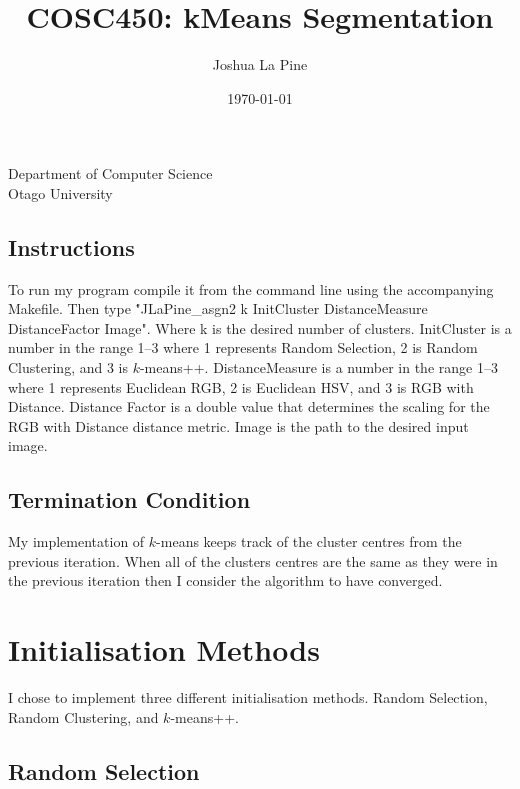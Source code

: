 \documentclass{article}
\title{COSC450: kMeans Segmentation} %
\author{Joshua La Pine} %
\date{\today} %
\begin{document}
\maketitle %

\begin{center}
Department of Computer Science \\
Otago University \\

\end{center}
\newpage

\tableofcontents
\newpage

\subsection{Instructions}

To run my program compile it from the command line using the accompanying Makefile. Then type "\.\/JLaPine\_asgn2 k InitCluster DistanceMeasure DistanceFactor Image". Where k is the desired number of clusters. InitCluster is a number in the range 1--3 where 1 represents Random Selection, 2 is Random Clustering, and 3 is $k$-means++. DistanceMeasure is a number in the range 1--3 where 1 represents Euclidean RGB, 2 is Euclidean HSV, and 3 is RGB with Distance. Distance Factor is a double value that determines the scaling for the RGB with Distance distance metric. Image is the path to the desired input image. 

\subsection{Termination Condition}

My implementation of $k$-means keeps track of the cluster centres from the previous iteration. When all of the clusters centres are the same as they were in the previous iteration then I consider the algorithm to have converged. 

\section{Initialisation Methods}

I chose to implement three different initialisation methods. Random Selection, Random Clustering, and $k$-means++.

\subsection{Random Selection}
\end{document}
